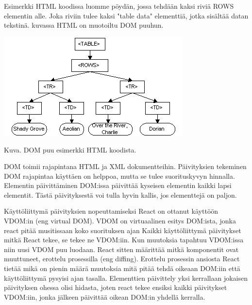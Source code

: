 Esimerkki HTML koodissa luomme pöydän, jossa tehdään kaksi riviä ROWS elementin alle. 
Joka riviin tulee kaksi "table data"{} elementtiä, jotka sisältää datan tekstinä.
kuvassa \nextImageCount {} HTML on muotoiltu DOM puuhun.
\bigskip



\includegraphics{./src/public/oppar/dom.png}

Kuva\getImgCount .{} DOM puu esimerkki HTML koodista. 
\medskip



DOM toimii rajapintana HTML ja XML dokumentteihin.
Päivityksien tekeminen DOM rajapintaa käyttäen on helppoa, mutta se tulee suorituskyvyn hinnalla.
Elementin päivittäminen DOM:issa päivittää kyseisen elementin kaikki lapsi elementit. 
Tästä päivityksestä voi tulla hyvin kallis, jos elementtejä on paljon.

\bigskip




Käyttöliittymä päivityksien nopeuttamiseksi React on ottanut käyttöön VDOM:in (eng virtual DOM).
VDOM on virtuaalinen esitys DOM:ista, jonka react pitää musitissaan koko suorituksen ajan
Kaikki käyttöliittymä päivitykset mitkä React tekee, se tekee ne VDOM:iin.
Kun muutoksia tapahtuu VDOM:issa niin uusi VDOM puu luodaan. React sitten määrittää mitkä komponentit ovat muuttuneet, erottelu prosessilla (eng diffing).
Erottelu prosessin ansiosta React tietää mikä on pienin määrä muutoksia mitä pitää tehdä oikeaan DOM:iin että käyttöliittymä pysyisi ajan tasalla.
Elementtien päivittely yksi kerrallaan jokaisen päivityksen ohessa olisi hidasta,
joten react tekee ensiksi kaikki päivitykset VDOM:iin, jonka jälkeen päivittää oikean DOM:in yhdellä kerralla.\citemissing
\medskip



